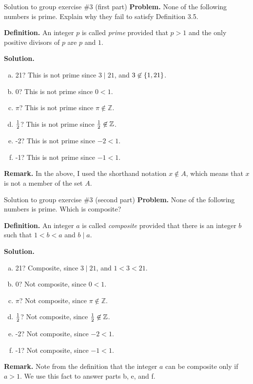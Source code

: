 \documentclass[10pt]{beamer}
\begin{document}
\begin{frame}{Solution to group exercise \#3 (first part)}
\textbf{Problem.} None of the following numbers is prime. Explain why they fail to satisfy Definition 3.5.
\vfill 

\begin{mygreenbox}
\textbf{Definition.} An integer $p$ is called \textit{prime} provided that $p>1$ and the only positive divisors of $p$ are $p$ and $1$.	
\end{mygreenbox}

\vfill 
\textbf{Solution.}
\begin{enumerate}[a.]
\item 21? This is not prime since $3 \mid 21$, and $3 \not\in \{ {1,21} \}$.  
\item 0?  This is not prime since $0<1$.  
\item $\pi$?  This is not prime since $\pi \not\in \mathbb{Z}$.  
\item $\frac{1}{2}$?  This is not prime since $\frac{1}{2} \not\in \mathbb{Z}$.  
\item -2?  This is not prime since $-2<1$.  
\item -1?  This is not prime since $-1<1$.  
\end{enumerate}
\vfill \vfill \vfill 
\textbf{Remark.} In the above, I used the shorthand notation $x \not\in A$, which means that $x$ is not a member of the set $A$. 
\end{frame}


\begin{frame}{Solution to group exercise \#3 (second part)}
\textbf{Problem.} None of the following numbers is prime. Which is composite?
\vfill 

\begin{mygreenbox}
\textbf{Definition.} An integer $a$ is called \textit{composite} provided that there is an integer $b$ such that $1<b<a$ and $b \mid a$.	
\end{mygreenbox}

\vfill 
\textbf{Solution.}
\begin{enumerate}[a.]
\item 21?  Composite, since $3 \mid 21$, and $1<3<21$.  
\item 0?  Not composite, since $0<1$.  
\item $\pi$?  Not composite, since $\pi \not\in \mathbb{Z}$.  
\item $\frac{1}{2}$?  Not composite, since $\frac{1}{2} \not\in \mathbb{Z}$.  
\item -2?  Not composite, since $-2 < 1$.  
\item -1?  Not composite, since $-1 < 1$.  
\end{enumerate}
\vfill 
\textbf{Remark.} Note from the definition that the integer $a$ can be composite only if $a>1$. We use this fact to answer parts b, e, and f.
\end{frame}
\end{document}
